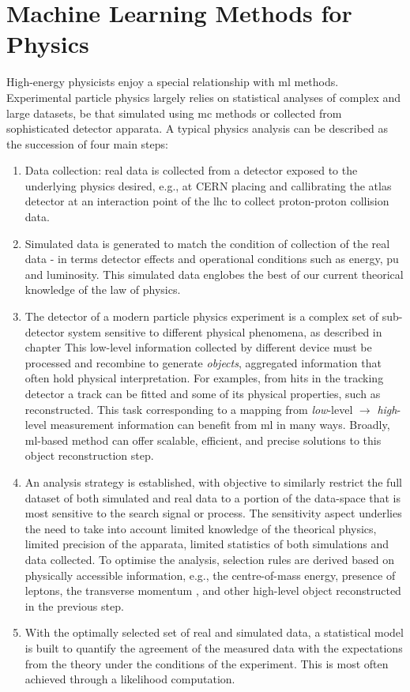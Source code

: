\section{Machine Learning Methods for Physics}
High-energy physicists enjoy a special relationship with \gls{ml} methods. Experimental particle physics largely relies on statistical analyses of complex and large datasets, be that simulated using \gls{mc} methods or collected from sophisticated detector apparata. A typical physics analysis can be described as the succession of four main steps:
\begin{enumerate}
    \item Data collection: real data is collected from a detector exposed to the underlying physics desired, e.g., at CERN placing and callibrating the \gls{atlas} detector at an interaction point of the \gls{lhc} to collect proton-proton collision data. 
    \item Simulated data is generated to match the condition of collection of the real data - in terms detector effects and operational conditions such as energy, \gls{pu} and luminosity. This simulated data englobes the best of our current theorical knowledge of the law of physics. 
    \item The detector of a modern particle physics experiment is a complex set of sub-detector system sensitive to different physical phenomena, as described in chapter %
    This low-level information collected by different device must be processed and recombine to generate \textit{objects}, aggregated information that often hold physical interpretation. For examples, from hits in the tracking detector a track can be fitted and some of its physical properties, such as \pt reconstructed. This task corresponding to a mapping from \textit{low}-level $\rightarrow$ \textit{high}-level measurement information can benefit from \gls{ml} in many ways. Broadly, \gls{ml}-based method can offer scalable, efficient, and precise solutions to this object reconstruction step. 
    \item An analysis strategy is established, with objective to similarly restrict the full dataset of both simulated and real data to a portion of the data-space that is most sensitive to the search signal or process. The sensitivity aspect underlies the need to take into account limited knowledge of the theorical physics, limited precision of the apparata, limited statistics of both simulations and data collected. To optimise the analysis, selection rules are derived based on physically accessible information, e.g., the centre-of-mass energy, presence of leptons, the transverse momentum \pt, and other high-level object reconstructed in the previous step.
    \item With the optimally selected set of real and simulated data, a statistical model is built to quantify the agreement of the measured data with the expectations from the theory under the conditions of the experiment. This is most often achieved through a likelihood computation.
\end{enumerate}

